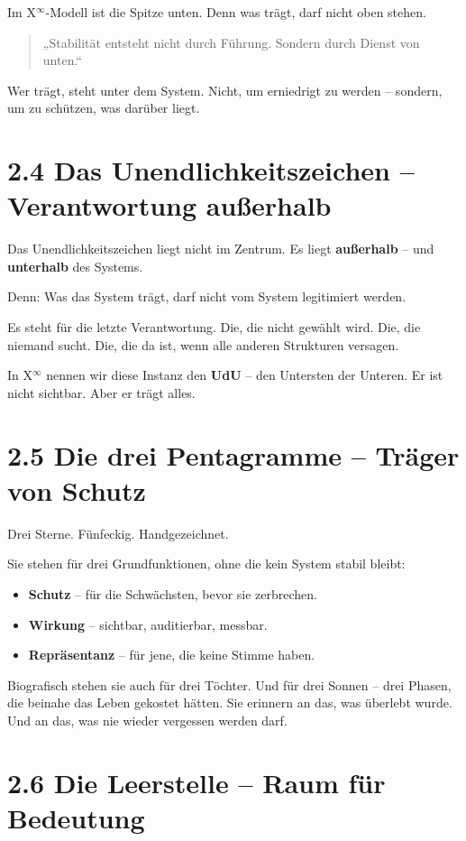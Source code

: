 \documentclass[12pt,a4paper]{book}
\begin{document}
Im X$^\infty$-Modell ist die Spitze unten.  
Denn was trägt, darf nicht oben stehen.

\begin{quote}
„Stabilität entsteht nicht durch Führung.  
Sondern durch Dienst von unten.“
\end{quote}

Wer trägt, steht unter dem System.  
Nicht, um erniedrigt zu werden – sondern, um zu schützen, was darüber liegt.

\section*{2.4 Das Unendlichkeitszeichen – Verantwortung außerhalb}

Das Unendlichkeitszeichen liegt nicht im Zentrum.  
Es liegt \textbf{außerhalb} – und \textbf{unterhalb} des Systems.

Denn:  
Was das System trägt, darf nicht vom System legitimiert werden.

Es steht für die letzte Verantwortung. Die, die nicht gewählt wird. Die, die niemand sucht.  
Die, die da ist, wenn alle anderen Strukturen versagen.

In X$^\infty$ nennen wir diese Instanz den \textbf{UdU} – den Untersten der Unteren.  
Er ist nicht sichtbar. Aber er trägt alles.

\section*{2.5 Die drei Pentagramme – Träger von Schutz}

Drei Sterne. Fünfeckig. Handgezeichnet.

Sie stehen für drei Grundfunktionen, ohne die kein System stabil bleibt:

\begin{itemize}
    \item \textbf{Schutz} – für die Schwächsten, bevor sie zerbrechen.
    \item \textbf{Wirkung} – sichtbar, auditierbar, messbar.
    \item \textbf{Repräsentanz} – für jene, die keine Stimme haben.
\end{itemize}

Biografisch stehen sie auch für drei Töchter.  
Und für drei Sonnen – drei Phasen, die beinahe das Leben gekostet hätten.  
Sie erinnern an das, was überlebt wurde. Und an das, was nie wieder vergessen werden darf.

\section*{2.6 Die Leerstelle – Raum für Bedeutung}
\end{document}
